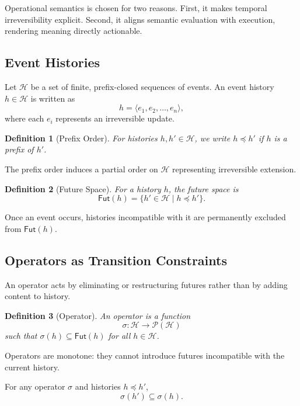 \documentclass[11pt]{article}
\newtheorem{definition}{Definition}
\newcommand{\Hist}{\mathcal{H}}
\begin{document}
Operational semantics is chosen for two reasons. First, it makes temporal
irreversibility explicit. Second, it aligns semantic evaluation with execution,
rendering meaning directly actionable.

\subsection{Event Histories}

Let $\Hist$ be a set of finite, prefix-closed sequences of events. An event
history $h \in \Hist$ is written as
\[
h = \langle e_1, e_2, \dots, e_n \rangle,
\]
where each $e_i$ represents an irreversible update.

\begin{definition}[Prefix Order]
For histories $h, h' \in \Hist$, we write $h \preceq h'$ if $h$ is a prefix of $h'$.
\end{definition}

The prefix order induces a partial order on $\Hist$ representing irreversible
extension.

\begin{definition}[Future Space]
For a history $h$, the future space is
\[
\mathsf{Fut}(h) = \{ h' \in \Hist \mid h \preceq h' \}.
\]
\end{definition}

Once an event occurs, histories incompatible with it are permanently excluded
from $\mathsf{Fut}(h)$.

\subsection{Operators as Transition Constraints}

An operator acts by eliminating or restructuring futures rather than by adding
content to history.

\begin{definition}[Operator]
An operator is a function
\[
\sigma : \Hist \to \mathcal{P}(\Hist)
\]
such that $\sigma(h) \subseteq \mathsf{Fut}(h)$ for all $h \in \Hist$.
\end{definition}

Operators are monotone: they cannot introduce futures incompatible with the
current history.

\begin{lemma}[Monotonicity]
For any operator $\sigma$ and histories $h \preceq h'$,
\[
\sigma(h') \subseteq \sigma(h).
\]
\end{lemma}
\end{document}
